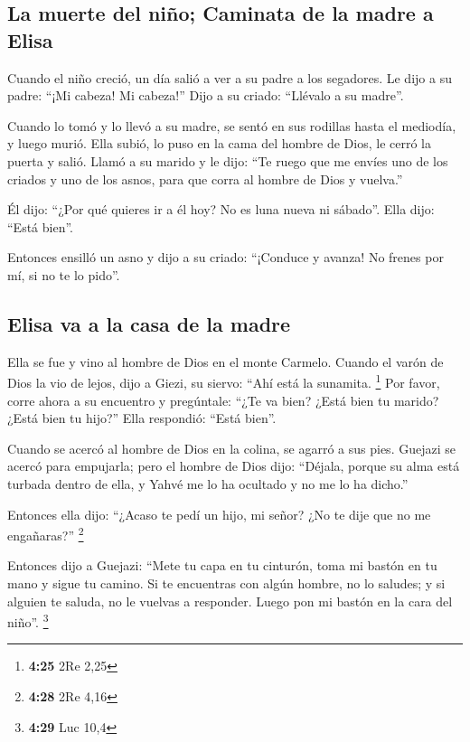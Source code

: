 \begin{paracol}{2}
\hypertarget{la-muerte-del-niuxf1o-caminata-de-la-madre-a-elisa}{%
\subsection{La muerte del niño; Caminata de la madre a
Elisa}\label{la-muerte-del-niuxf1o-caminata-de-la-madre-a-elisa}}

 Cuando el niño creció, un día salió a ver a su padre a
los segadores.  Le dijo a su padre: ``¡Mi cabeza! Mi
cabeza!'' Dijo a su criado: ``Llévalo a su madre''.

 Cuando lo tomó y lo llevó a su madre, se sentó en sus
rodillas hasta el mediodía, y luego murió.  Ella subió,
lo puso en la cama del hombre de Dios, le cerró la puerta y salió.
 Llamó a su marido y le dijo: ``Te ruego que me envíes
uno de los criados y uno de los asnos, para que corra al hombre de Dios
y vuelva.''

 Él dijo: ``¿Por qué quieres ir a él hoy? No es luna
nueva ni sábado''. Ella dijo: ``Está bien''.

 Entonces ensilló un asno y dijo a su criado: ``¡Conduce
y avanza! No frenes por mí, si no te lo pido''.

\hypertarget{elisa-va-a-la-casa-de-la-madre}{%
\subsection{Elisa va a la casa de la
madre}\label{elisa-va-a-la-casa-de-la-madre}}

 Ella se fue y vino al hombre de Dios en el monte
Carmelo. Cuando el varón de Dios la vio de lejos, dijo a Giezi, su
siervo: ``Ahí está la sunamita. \footnote{\textbf{4:25} 2Re 2,25}
 Por favor, corre ahora a su encuentro y pregúntale:
``¿Te va bien? ¿Está bien tu marido? ¿Está bien tu hijo?'' Ella
respondió: ``Está bien''.

 Cuando se acercó al hombre de Dios en la colina, se
agarró a sus pies. Guejazi se acercó para empujarla; pero el hombre de
Dios dijo: ``Déjala, porque su alma está turbada dentro de ella, y Yahvé
me lo ha ocultado y no me lo ha dicho.''

 Entonces ella dijo: ``¿Acaso te pedí un hijo, mi señor?
¿No te dije que no me engañaras?'' \footnote{\textbf{4:28} 2Re 4,16}

 Entonces dijo a Guejazi: ``Mete tu capa en tu cinturón,
toma mi bastón en tu mano y sigue tu camino. Si te encuentras con algún
hombre, no lo saludes; y si alguien te saluda, no le vuelvas a
responder. Luego pon mi bastón en la cara del niño''. \footnote{\textbf{4:29}
  Luc 10,4}


\end{paracol}
